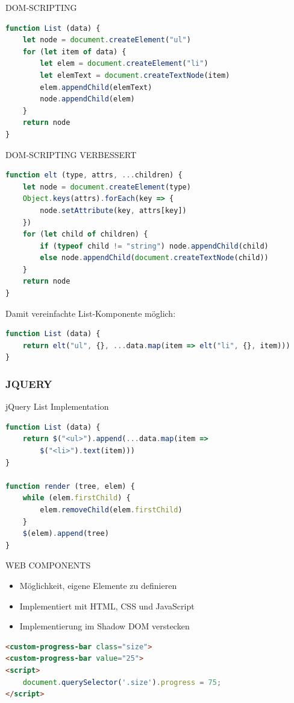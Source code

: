 \begin{definition}{DOM-SCRIPTING}
\begin{lstlisting}[language=JavaScript, style=basesmol]
function List (data) {
    let node = document.createElement("ul")
    for (let item of data) {
        let elem = document.createElement("li")
        let elemText = document.createTextNode(item)
        elem.appendChild(elemText)
        node.appendChild(elem)
    }
    return node
}
\end{lstlisting}
\end{definition}

\begin{definition}{DOM-SCRIPTING VERBESSERT}
\begin{lstlisting}[language=JavaScript, style=basesmol]
function elt (type, attrs, ...children) {
    let node = document.createElement(type)
    Object.keys(attrs).forEach(key => {
        node.setAttribute(key, attrs[key])
    })
    for (let child of children) {
        if (typeof child != "string") node.appendChild(child)
        else node.appendChild(document.createTextNode(child))
    }
    return node
}
\end{lstlisting}

Damit vereinfachte List-Komponente möglich:
\begin{lstlisting}[language=JavaScript, style=basesmol]
function List (data) {
    return elt("ul", {}, ...data.map(item => elt("li", {}, item)))
}
\end{lstlisting}
\end{definition}

\subsubsection{JQUERY}

\begin{code}{jQuery List Implementation}
\begin{lstlisting}[language=JavaScript, style=basesmol]
function List (data) {
    return $("<ul>").append(...data.map(item => 
        $("<li>").text(item)))
}

function render (tree, elem) {
    while (elem.firstChild) { 
        elem.removeChild(elem.firstChild) 
    }
    $(elem).append(tree)
}
\end{lstlisting}
\end{code}

\begin{definition}{WEB COMPONENTS}
\begin{itemize}
  \item Möglichkeit, eigene Elemente zu definieren
  \item Implementiert mit HTML, CSS und JavaScript
  \item Implementierung im Shadow DOM verstecken
\end{itemize}

\begin{lstlisting}[language=HTML, style=basesmol]
<custom-progress-bar class="size">
<custom-progress-bar value="25">
<script>
    document.querySelector('.size').progress = 75;
</script>
\end{lstlisting}
\end{definition}


